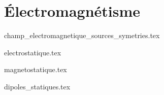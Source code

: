 \part{Électromagnétisme}

{champ_electromagnetique_sources_symetries.tex}

{electrostatique.tex}

{magnetostatique.tex}

{dipoles_statiques.tex}